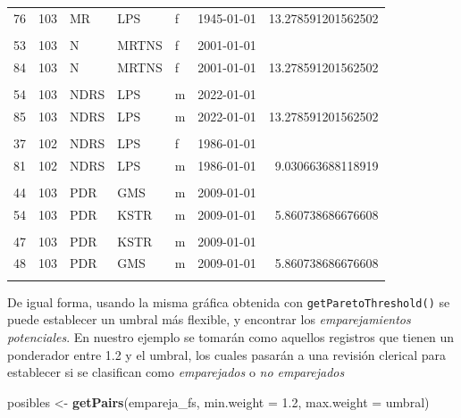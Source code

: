 \documentclass[
  12pt,
]{book}
\newenvironment{Shaded}{\begin{snugshade}}{\end{snugshade}}
\newcommand{\AttributeTok}[1]{\textcolor[rgb]{0.13,0.29,0.53}{#1}}
\newcommand{\FloatTok}[1]{\textcolor[rgb]{0.00,0.00,0.81}{#1}}
\newcommand{\FunctionTok}[1]{\textcolor[rgb]{0.13,0.29,0.53}{\textbf{#1}}}
\newcommand{\NormalTok}[1]{#1}
\newcommand{\OtherTok}[1]{\textcolor[rgb]{0.56,0.35,0.01}{#1}}
\begin{document}
\begin{table}[t]
\begin{tabular*}{1\linewidth}{@{\extracolsep{\fill}}rrlllrr}
76 & 103 & MR & LPS & f & 1945-01-01 & 13.278591201562502 \\ 
 &  &  &  &  &  &  \\ 
53 & 103 & N & MRTNS & f & 2001-01-01 &  \\ 
84 & 103 & N & MRTNS & f & 2001-01-01 & 13.278591201562502 \\ 
 &  &  &  &  &  &  \\ 
54 & 103 & NDRS & LPS & m & 2022-01-01 &  \\ 
85 & 103 & NDRS & LPS & m & 2022-01-01 & 13.278591201562502 \\ 
 &  &  &  &  &  &  \\ 
37 & 102 & NDRS & LPS & f & 1986-01-01 &  \\ 
81 & 102 & NDRS & LPS & m & 1986-01-01 &  9.030663688118919 \\ 
 &  &  &  &  &  &  \\ 
44 & 103 & PDR & GMS & m & 2009-01-01 &  \\ 
54 & 103 & PDR & KSTR & m & 2009-01-01 &  5.860738686676608 \\ 
 &  &  &  &  &  &  \\ 
47 & 103 & PDR & KSTR & m & 2009-01-01 &  \\ 
48 & 103 & PDR & GMS & m & 2009-01-01 &  5.860738686676608 \\ 
 &  &  &  &  &  &  \\ 
\bottomrule
\end{tabular*}
\end{table}

De igual forma, usando la misma gráfica obtenida con \texttt{getParetoThreshold()} se puede establecer un umbral más flexible, y encontrar los \emph{emparejamientos potenciales}. En nuestro ejemplo se tomarán como aquellos registros que tienen un ponderador entre 1.2 y el umbral, los cuales pasarán a una revisión clerical para establecer si se clasifican como \emph{emparejados} o \emph{no emparejados}

\begin{Shaded}
\begin{Highlighting}[]
\NormalTok{posibles }\OtherTok{\textless{}{-}} \FunctionTok{getPairs}\NormalTok{(empareja\_fs, }\AttributeTok{min.weight =} \FloatTok{1.2}\NormalTok{, }\AttributeTok{max.weight =}\NormalTok{ umbral)}
\end{Highlighting}
\end{Shaded}
\end{document}
